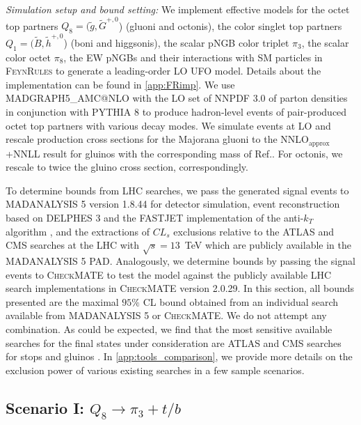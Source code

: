 \documentclass[preprintnumbers,nofootinbib,showpacs,eqsecnum,pre,12pt]{revtex4-1}
\begin{document}
\emph{Simulation setup and bound setting:} We implement effective models for the octet top partners $Q_8=(\tilde{g}, \tilde{G}^{+,0}$) (gluoni and octonis), the color singlet top partners $Q_1=(\tilde{B}, \tilde{h}^{+,0}$) (boni and higgsonis), the scalar pNGB color triplet $\pi_3$, the scalar color octet $\pi_8$, the EW pNGBs and their interactions with SM particles in \textsc{FeynRules} \cite{Alloul:2013bka,Christensen:2009jx,Degrande:2011ua} to generate a leading-order \textsc{LO UFO} model. Details about the implementation can be found in \cref{app:FRimp}. We use \textsc{MADGRAPH5\_AMC@NLO} \cite{Alwall:2014hca} with the LO set of \textsc{NNPDF 3.0} of parton densities \cite{NNPDF:2014otw,Buckley:2014ana} in conjunction with \textsc{PYTHIA 8} \cite{Sjostrand:2014zea} to produce hadron-level events of pair-produced octet top partners with various decay modes. We simulate events at LO and rescale production cross sections for the Majorana gluoni to the NNLO$_\text{approx}$+NNLL result for gluinos with the corresponding mass of Ref.\cite{Beenakker:2016lwe}. For octonis, we rescale to twice the gluino cross section, correspondingly.

To determine bounds from LHC searches, we pass the generated signal events to \textsc{MADANALYSIS 5} version 1.8.44 \cite{Conte:2012fm,Conte:2014zja,Dumont:2014tja,Conte:2018vmg} for detector simulation, event reconstruction based on \textsc{DELPHES 3} \cite{deFavereau:2013fsa} and the \textsc{FASTJET} \cite{Cacciari:2011ma} implementation of the anti-$k_T$ algorithm \cite{Cacciari:2008gp}, and the extractions of $CL_s$ exclusions relative to the ATLAS and CMS searches at the LHC with $\sqrt{s}=13$~TeV which are publicly available in the \textsc{MADANALYSIS 5 PAD}. Analogously, we determine bounds by passing the signal events to \textsc{CheckMATE} \cite{Drees:2013wra,Dercks:2016npn} to test the model against the publicly available LHC search implementations in \textsc{CheckMATE} version 2.0.29. In this section, all bounds presented are the maximal $95\%$ CL bound obtained from an individual search available from \textsc{MADANALYSIS 5} or \textsc{CheckMATE}. We do not attempt any combination. As could be expected, we find that the most sensitive available searches for the final states under consideration are ATLAS and CMS searches for stops and gluinos \cite{CMS:2019zmd,ATLAS:2019vcq,ATLAS:2018yhd}. In \cref{app:tools_comparison}, we provide more details on the exclusion power of various existing searches in a few sample scenarios.

\subsection{Scenario I: $Q_8\to\pi_3+t/b$}
\end{document}
